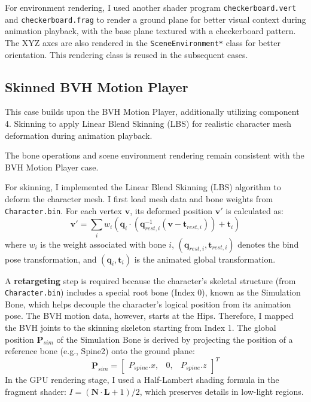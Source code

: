 \documentclass[8pt,a4paper]{extarticle}
\begin{document}
For environment rendering, I used another shader program \texttt{checkerboard.vert} and \texttt{checkerboard.frag} to render a ground plane for better visual context during animation playback, with the base plane textured with a checkerboard pattern. The XYZ axes are also rendered in the \texttt{SceneEnvironment*} class for better orientation. This rendering class is reused in the subsequent cases.


\subsection{Skinned BVH Motion Player}
This case builds upon the BVH Motion Player, additionally utilizing component 4. Skinning to apply Linear Blend Skinning (LBS) for realistic character mesh deformation during animation playback.

The bone operations and scene environment rendering remain consistent with the BVH Motion Player case.

For skinning, I implemented the Linear Blend Skinning (LBS) algorithm to deform the character mesh. I first load mesh data and bone weights from \texttt{Character.bin}. For each vertex $\mathbf{v}$, its deformed position $\mathbf{v}'$ is calculated as:
\[
    \mathbf{v}' = \sum_{i} w_i \left( \mathbf{q}_i \cdot (\mathbf{q}_{rest, i}^{-1} (\mathbf{v} - \mathbf{t}_{rest, i})) + \mathbf{t}_i \right)
\]
where $w_i$ is the weight associated with bone $i$, $(\mathbf{q}_{rest, i}, \mathbf{t}_{rest, i})$ denotes the bind pose transformation, and $(\mathbf{q}_i, \mathbf{t}_i)$ is the animated global transformation.

A \textbf{retargeting} step is required because the character's skeletal structure (from \texttt{Character.bin}) includes a special root bone (Index 0), known as the Simulation Bone, which helps decouple the character's logical position from its animation pose. The BVH motion data, however, starts at the Hips. Therefore, I mapped the BVH joints to the skinning skeleton starting from Index 1. The global position $\mathbf{P}_{sim}$ of the Simulation Bone is derived by projecting the position of a reference bone (e.g., Spine2) onto the ground plane:
\[
    \mathbf{P}_{sim} = \begin{bmatrix} P_{spine}.x, & 0, & P_{spine}.z \end{bmatrix}^T
\]
In the GPU rendering stage, I used a Half-Lambert shading formula in the fragment shader: $I = (\mathbf{N} \cdot \mathbf{L} + 1) / 2$, which preserves details in low-light regions.
\end{document}
